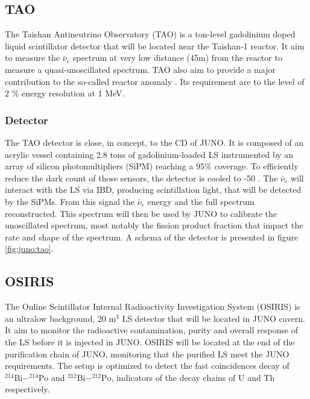 \documentclass[../main.tex]{subfiles}
\begin{document}
\subsection{TAO}
\label{sec:juno:tao}
The Taishan Antineutrino Observatory (TAO) \cite{juno_collaboration_tao_2020, steiger_tao_2022} is a ton-level gadolinium doped liquid scintillator detector that will be located near the Taishan-1 reactor. It aim to measure the $\bar{\nu}_e$ spectrum at very low distance (45m) from the reactor to measure a quasi-unoscillated spectrum. TAO also aim to provide a major contribution to the so-called reactor anomaly \cite{mention_reactor_2011}. Its requirement are to the level of 2 \% energy resolution at 1 MeV.

\subsubsection{Detector}

The TAO detector is close, in concept, to the CD of JUNO. It is composed of an acrylic vessel containing 2.8 tons of gadolinium-loaded LS instrumented by an array of silicon photomultipliers (SiPM) reaching a 95\% coverage. To efficiently reduce the dark count of those sensors, the detector is cooled to -50 \textcelsius.
The $\bar{\nu}_e$ will interact with the LS via IBD, producing scintillation light, that will be detected by the SiPMs. From this signal the $\bar{\nu}_e$ energy and the full spectrum reconstructed.
This spectrum will then be used by JUNO to calibrate the unoscillated spectrum, most notably the fission product fraction that impact the rate and shape of the spectrum. A schema of the detector is presented in figure \ref{fig:juno:tao}.

\subsection{OSIRIS}
\label{sec:juno:OSIRIS}
The Online Scintillator Internal Radioactivity Investigation System (OSIRIS) \cite{juno_collaboration_design_2021} is an ultralow background, 20 m$^3$ LS detector that will be located in JUNO cavern. It aim to monitor the radioactive contamination, purity and overall response of the LS before it is injected in JUNO.
OSIRIS will be located at the end of the purification chain of JUNO, monitoring that the purified LS meet the JUNO requirements. The setup is optimized to detect the fast coincidences decay of $^{214}\mathrm{Bi}-^{214}\mathrm{Po}$ and $^{212}\mathrm{Bi}-^{212}\mathrm{Po}$, indicators of the decay chains of U and Th respectively.
\end{document}
